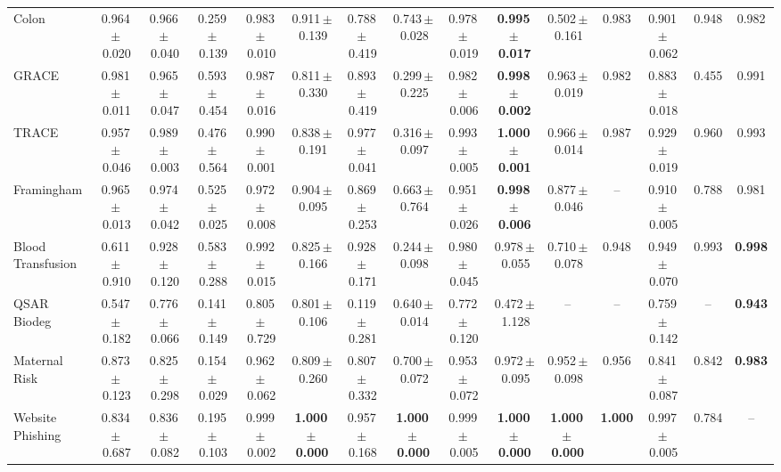\documentclass[8pt]{extarticle}
\begin{document}
\begin{longtable}{l*{14}{c}}
Colon & 0.964\,$\pm$\,0.020 & 0.966\,$\pm$\,0.040 & 0.259\,$\pm$\,0.139 & 0.983\,$\pm$\,0.010 & 0.911\,$\pm$\,0.139 & 0.788\,$\pm$\,0.419 & 0.743\,$\pm$\,0.028 & 0.978\,$\pm$\,0.019 & \textbf{0.995\,$\pm$\,0.017} & 0.502\,$\pm$\,0.161 & 0.983 & 0.901\,$\pm$\,0.062 & 0.948 & 0.982 \\
GRACE & 0.981\,$\pm$\,0.011 & 0.965\,$\pm$\,0.047 & 0.593\,$\pm$\,0.454 & 0.987\,$\pm$\,0.016 & 0.811\,$\pm$\,0.330 & 0.893\,$\pm$\,0.419 & 0.299\,$\pm$\,0.225 & 0.982\,$\pm$\,0.006 & \textbf{0.998\,$\pm$\,0.002} & 0.963\,$\pm$\,0.019 & 0.982 & 0.883\,$\pm$\,0.018 & 0.455 & 0.991 \\
TRACE & 0.957\,$\pm$\,0.046 & 0.989\,$\pm$\,0.003 & 0.476\,$\pm$\,0.564 & 0.990\,$\pm$\,0.001 & 0.838\,$\pm$\,0.191 & 0.977\,$\pm$\,0.041 & 0.316\,$\pm$\,0.097 & 0.993\,$\pm$\,0.005 & \textbf{1.000\,$\pm$\,0.001} & 0.966\,$\pm$\,0.014 & 0.987 & 0.929\,$\pm$\,0.019 & 0.960 & 0.993 \\
Framingham & 0.965\,$\pm$\,0.013 & 0.974\,$\pm$\,0.042 & 0.525\,$\pm$\,0.025 & 0.972\,$\pm$\,0.008 & 0.904\,$\pm$\,0.095 & 0.869\,$\pm$\,0.253 & 0.663\,$\pm$\,0.764 & 0.951\,$\pm$\,0.026 & \textbf{0.998\,$\pm$\,0.006} & 0.877\,$\pm$\,0.046 & -- & 0.910\,$\pm$\,0.005 & 0.788 & 0.981 \\
Blood Transfusion & 0.611\,$\pm$\,0.910 & 0.928\,$\pm$\,0.120 & 0.583\,$\pm$\,0.288 & 0.992\,$\pm$\,0.015 & 0.825\,$\pm$\,0.166 & 0.928\,$\pm$\,0.171 & 0.244\,$\pm$\,0.098 & 0.980\,$\pm$\,0.045 & 0.978\,$\pm$\,0.055 & 0.710\,$\pm$\,0.078 & 0.948 & 0.949\,$\pm$\,0.070 & 0.993 & \textbf{0.998} \\
QSAR Biodeg & 0.547\,$\pm$\,0.182 & 0.776\,$\pm$\,0.066 & 0.141\,$\pm$\,0.149 & 0.805\,$\pm$\,0.729 & 0.801\,$\pm$\,0.106 & 0.119\,$\pm$\,0.281 & 0.640\,$\pm$\,0.014 & 0.772\,$\pm$\,0.120 & 0.472\,$\pm$\,1.128 & -- & -- & 0.759\,$\pm$\,0.142 & -- & \textbf{0.943} \\
Maternal Risk & 0.873\,$\pm$\,0.123 & 0.825\,$\pm$\,0.298 & 0.154\,$\pm$\,0.029 & 0.962\,$\pm$\,0.062 & 0.809\,$\pm$\,0.260 & 0.807\,$\pm$\,0.332 & 0.700\,$\pm$\,0.072 & 0.953\,$\pm$\,0.072 & 0.972\,$\pm$\,0.095 & 0.952\,$\pm$\,0.098 & 0.956 & 0.841\,$\pm$\,0.087 & 0.842 & \textbf{0.983} \\
Website Phishing & 0.834\,$\pm$\,0.687 & 0.836\,$\pm$\,0.082 & 0.195\,$\pm$\,0.103 & 0.999\,$\pm$\,0.002 & \textbf{1.000\,$\pm$\,0.000} & 0.957\,$\pm$\,0.168 & \textbf{1.000\,$\pm$\,0.000} & 0.999\,$\pm$\,0.005 & \textbf{1.000\,$\pm$\,0.000} & \textbf{1.000\,$\pm$\,0.000} & \textbf{1.000} & 0.997\,$\pm$\,0.005 & 0.784 & -- \\
\end{longtable}
\end{document}
